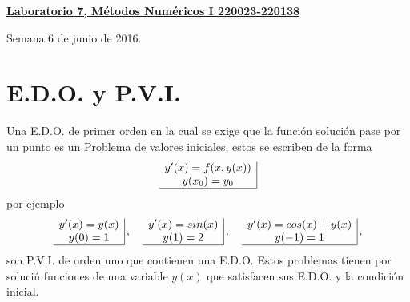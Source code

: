 \documentclass[11pt]{article}
\begin{document}
\hspace*{-1,5cm}


\vspace*{0.5cm} \centerline {\bf\underline{Laboratorio 7, M\'etodos Num\'ericos I 220023-220138}}
\centerline{\textrm{Semana 6 de junio de 2016.}}  \vspace{0.2cm}



\section{E.D.O. y P.V.I.}
Una E.D.O. de primer orden en la cual se exige que la funci\'on soluci\'on pase por un punto es un Problema de valores iniciales, estos se escriben de la forma
$$
\begin{array}{c|}
y'(x)=f(x,y(x))\\
y(x_0)=y_0\\
\hline
\end{array}
$$
por ejemplo
$$
\begin{array}{c|}
y'(x)=y(x)\\
y(0)=1\\
\hline
\end{array}\,,
\quad 
\begin{array}{c|}
y'(x)=sin(x)\\
y(1)=2\\
\hline
\end{array}\,,
\quad 
\begin{array}{c|}
y'(x)=cos(x)+y(x)\\
y(-1)=1\\
\hline
\end{array}\,,
$$
son  P.V.I. de orden uno que contienen una E.D.O. Estos problemas tienen por soluci\'n funciones de una variable $y(x)$ que satisfacen sus E.D.O. y la condici\'on inicial.
\end{document}
